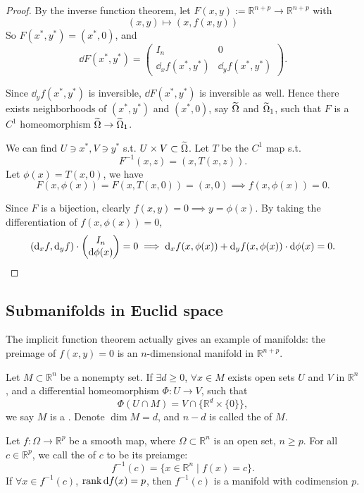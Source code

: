 \begin{proof}[Proof]
    By the inverse function theorem,
	let $F(x,y):= \mathbb{R}^{n+p}\to \mathbb{R}^{n+p}$ with
	\[
		(x,y)\mapsto (x, f(x,y))
	\]
	So $F(x^*, y^*) = (x^*, 0)$, and
	\[
	\dd F(x^*, y^*) = \begin{pmatrix}
		I_n &0 \\ \dd_x f(x^*, y^*) &\dd_y f(x^*, y^*)
	\end{pmatrix}.
	\]

	Since $\dd_y f(x^*, y^*)$ is inversible, $\dd F(x^*, y^*)$ is
	inversible as well.
	Hence there exists neighborhoods of $(x^*, y^*)$ and $(x^*, 0)$,
	say $\widetilde{\Omega}$ and $\widetilde{\Omega}_1$, such that
	$F$ is a $C^1$ homeomorphism $\widetilde{\Omega}\to \widetilde{\Omega}_1$.

	We can find $U\ni x^*, V\ni y^*$ s.t. $U\times V \subset \widetilde{\Omega}$.
	Let $T$ be the $C^1$ map s.t.
	\[
	F^{-1}(x, z) = (x, T(x, z)).
	\]
	Let $\phi(x) = T(x, 0)$, we have
	\[
	F(x, \phi(x)) = F(x, T(x, 0)) = (x, 0) \implies f(x, \phi(x)) = 0.
	\]

	Since $F$ is a bijection, clearly $f(x, y) = 0\implies y=\phi(x)$.
	By taking the differentiation of $f(x, \phi(x)) = 0$,
	\[
		(\mathop{}\!\mathrm{d}_x f, \mathop{}\!\mathrm{d}_y f) \cdot \begin{pmatrix} I_n\\\mathop{}\!\mathrm{d} \phi(x) \end{pmatrix} = 0\implies
		\mathop{}\!\mathrm{d}_x f(x, \phi(x)) + \mathop{}\!\mathrm{d}_y f(x, \phi(x))\cdot \mathop{}\!\mathrm{d}\phi(x) = 0.
	\]
\end{proof}

\subsection{Submanifolds in Euclid space}
\label{sub:Submanifolds in Euclid space}
The implicit function theorem actually gives an example
of manifolds: the preimage of $f(x, y) = 0$ is an $n$-dimensional manifold
in $\mathbb{R}^{n+p}$.

\begin{definition}[Manifolds]
	Let $M \subset \mathbb{R}^{n}$ be a nonempty set.
	If $\exists d\ge 0$, $\forall x\in M$ exists open sets $U$ and $V$
	in $\mathbb{R}^{n}$, and a differential
	homeomorphism $\Phi: U\to V$, such that
	\[
		\Phi(U\cap M) = V\cap \{\mathbb{R}^{d}\times \{0\}\},
	\]
	we say $M$ is a .
	Denote $\dim M = d$, and $n - d$ is called the  of $M$.
\end{definition}

\begin{corollary}
    Let $f: \Omega \to \mathbb{R}^{p}$ be a smooth map, where
	$\Omega \subset \mathbb{R}^{n}$ is an open set, $n\ge p$.
	For all $c\in \mathbb{R}^{p}$, we call the  of
	$c$ to be its preiamge:
	\[
	f^{-1}(c) = \{x\in \mathbb{R}^{n} \mid f(x) = c\}.
	\]
	If $\forall x\in f^{-1}(c)$, $\operatorname{rank} \mathop{}\!\mathrm{d} f(x) = p$,
	then $f^{-1}(c)$ is a manifold with codimension $p$.
\end{corollary}

